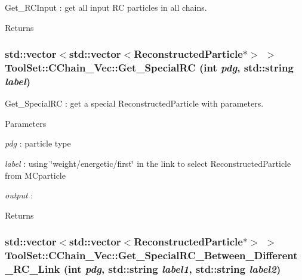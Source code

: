 Get\_\-RCInput : get all input RC particles in all chains. \begin{DoxyReturn}{Returns}

\end{DoxyReturn}
\hypertarget{classToolSet_1_1CChain__Vec_a3cc0cdb7a3ed1b11da160fb5f709694f}{
\subsubsection[{Get\_\-SpecialRC}]{\setlength{\rightskip}{0pt plus 5cm}std::vector$<$std::vector$<$ReconstructedParticle$\ast$$>$ $>$ ToolSet::CChain\_\-Vec::Get\_\-SpecialRC (int {\em pdg}, \/  std::string {\em label})}}
\label{classToolSet_1_1CChain__Vec_a3cc0cdb7a3ed1b11da160fb5f709694f}


Get\_\-SpecialRC : get a special ReconstructedParticle with parameters. 
\begin{DoxyParams}{Parameters}
\item[{\em pdg}]: particle type \item[{\em label}]: using \char`\"{}weight/energetic/first\char`\"{} in the link to select ReconstructedParticle from MCparticle \item[{\em output}]:\end{DoxyParams}
\begin{DoxyReturn}{Returns}

\end{DoxyReturn}
\hypertarget{classToolSet_1_1CChain__Vec_abf7fb35af91c6059d381d5a278a96574}{
\subsubsection[{Get\_\-SpecialRC\_\-Between\_\-Different\_\-RC\_\-Link}]{\setlength{\rightskip}{0pt plus 5cm}std::vector$<$std::vector$<$ReconstructedParticle$\ast$$>$ $>$ ToolSet::CChain\_\-Vec::Get\_\-SpecialRC\_\-Between\_\-Different\_\-RC\_\-Link (int {\em pdg}, \/  std::string {\em label1}, \/  std::string {\em label2})}}
\label{classToolSet_1_1CChain__Vec_abf7fb35af91c6059d381d5a278a96574}



